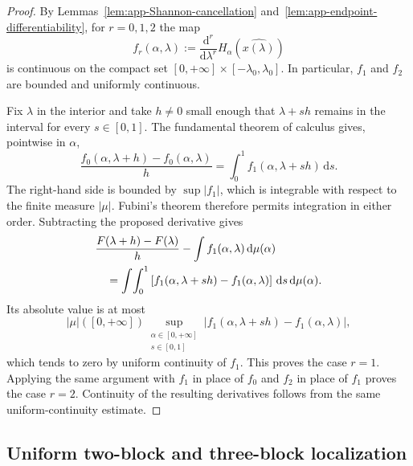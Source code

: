\documentclass[aps,pra,11pt,onecolumn,nofootinbib,tightenlines]{revtex4-2}
\theoremstyle{definition}
\begin{document}
\begin{proof}
By Lemmas~\ref{lem:app-Shannon-cancellation} and~\ref{lem:app-endpoint-differentiability}, for $r=0,1,2$ the map
\begin{equation}
 f_r(\alpha,\lambda):=
 \frac{\mathrm d^r}{\mathrm d\lambda^r}
 H_\alpha(\widehat{x(\lambda)})
 \label{eq:app-f-r}
\end{equation}
is continuous on the compact set
$[0,+\infty]\times[-\lambda_0,\lambda_0]$.  In particular, $f_1$ and $f_2$ are bounded and uniformly continuous.

Fix $\lambda$ in the interior and take $h\neq0$ small enough that $\lambda+sh$ remains in the interval for every $s\in[0,1]$.  The fundamental theorem of calculus gives, pointwise in $\alpha$,
\begin{equation}
 \frac{f_0(\alpha,\lambda+h)-f_0(\alpha,\lambda)}h
 =\int_0^1 f_1(\alpha,\lambda+sh)\,\mathrm ds.
 \label{eq:app-FTC-difference-quotient}
\end{equation}
The right-hand side is bounded by $\sup|f_1|$, which is integrable with respect to the finite measure $|\mu|$.  Fubini's theorem therefore permits integration in either order.  Subtracting the proposed derivative gives
\begin{align}
 &\frac{F(\lambda+h)-F(\lambda)}h
 -\int f_1(\alpha,\lambda)\,\mathrm d\mu(\alpha)
 \notag\\
 &\quad=
 \int\!\int_0^1
 \left[f_1(\alpha,\lambda+sh)-f_1(\alpha,\lambda)\right]
 \,\mathrm ds\,\mathrm d\mu(\alpha).
 \label{eq:app-fixed-d-difference}
\end{align}
Its absolute value is at most
\begin{equation}
 |\mu|([0,+\infty])
 \sup_{\substack{\alpha\in[0,+\infty]\\s\in[0,1]}}
 \left|f_1(\alpha,\lambda+sh)-f_1(\alpha,\lambda)\right|,
 \label{eq:app-fixed-d-modulus}
\end{equation}
which tends to zero by uniform continuity of $f_1$.  This proves the case $r=1$.  Applying the same argument with $f_1$ in place of $f_0$ and $f_2$ in place of $f_1$ proves the case $r=2$.  Continuity of the resulting derivatives follows from the same uniform-continuity estimate.
\end{proof}

\subsection{Uniform two-block and three-block localization}
\label{app:block-localisation}
\end{document}
